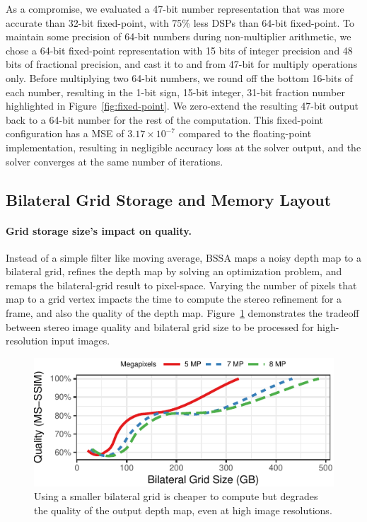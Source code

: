 As a compromise, we evaluated a 47-bit number representation that was more accurate than 32-bit fixed-point, with 75\% less DSPs than 64-bit fixed-point.
To maintain some precision of 64-bit numbers during non-multiplier arithmetic, we chose a 64-bit fixed-point representation with 15 bits of integer precision and 48 bits of fractional precision, and cast it to and from 47-bit for multiply operations only.
Before multiplying two 64-bit numbers, we round off the bottom 16-bits of each number, resulting in the 1-bit sign, 15-bit integer, 31-bit fraction number highlighted in Figure~\ref{fig:fixed-point}.
We zero-extend the resulting 47-bit output back to a 64-bit number for the rest of the computation.
This fixed-point configuration has a MSE of $3.17\times10^{-7}$ compared to the floating-point implementation, resulting in negligible accuracy loss at the solver output, and the solver converges at the same number of iterations.


\subsection{Bilateral Grid Storage and Memory Layout}

\paragraph{Grid storage size's impact on quality.} Instead of a simple filter like moving average, BSSA maps a noisy depth map to a bilateral grid, refines the depth map by solving an optimization problem, and remaps the bilateral-grid result to pixel-space. Varying the number of pixels that map to a grid vertex impacts the time to compute the stereo refinement for a frame, and also the quality of the depth map. Figure~\ref{fig:vr-res-qual} demonstrates the tradeoff between stereo image quality and bilateral grid size to be processed for high-resolution input images.

\begin{figure}[h]
\centering
    \begin{center}
\includegraphics[width=.7\textwidth]{nsp-figs/vr_res_qual.pdf}
    \end{center}
    \caption{Using a smaller bilateral grid is cheaper to compute but degrades the quality of the output depth map, even at high image resolutions. }
    \label{fig:vr-res-qual}
\end{figure}

